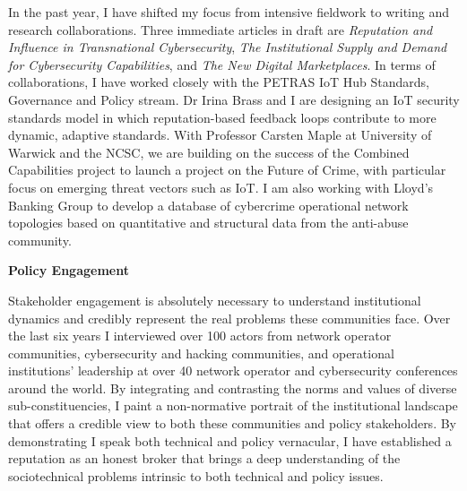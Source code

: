 \documentclass[11pt]{letter}
\begin{document}
\begin{letter}
In the past year, I have shifted my focus from intensive fieldwork to
writing and research collaborations. 
%
Three immediate articles in draft are \emph{Reputation and Influence
  in Transnational Cybersecurity}, \emph{The Institutional Supply and
  Demand for Cybersecurity Capabilities}, and \emph{The New Digital
  Marketplaces}. 
%
In terms of collaborations, I have worked closely with the PETRAS IoT
Hub Standards, Governance and Policy stream. 
%
Dr Irina Brass and I are designing an IoT security standards model in
which reputation-based feedback loops contribute to more dynamic,
adaptive standards. 
%
With Professor Carsten Maple at University of Warwick and the NCSC, we
are building on the success of the Combined Capabilities 
project to launch a project on the Future of Crime, with particular
focus on emerging threat vectors such as IoT. 
%
I am also working with Lloyd's Banking Group to develop a database of
cybercrime operational network topologies based on quantitative and
structural data from the anti-abuse community.
%

\textbf{Policy Engagement} 
\vspace{0.2 \baselineskip} 
\newline  

Stakeholder engagement is absolutely necessary to understand
institutional dynamics and credibly represent the real problems these
communities face. 
%
Over the last six years I interviewed over 100 actors from network
operator communities, cybersecurity and hacking communities, and
operational institutions' leadership at over 40 network operator and
cybersecurity conferences around the world. 
%
By integrating and contrasting the norms and values of diverse
sub-constituencies, I paint a non-normative portrait of the
institutional landscape  
that offers a credible view to both these communities and policy stakeholders. 
%
By demonstrating I speak both technical and policy vernacular, I have
established a reputation as an honest broker that brings a deep
understanding of the sociotechnical problems intrinsic to both
technical and policy issues.



\end{letter}
\end{document}
